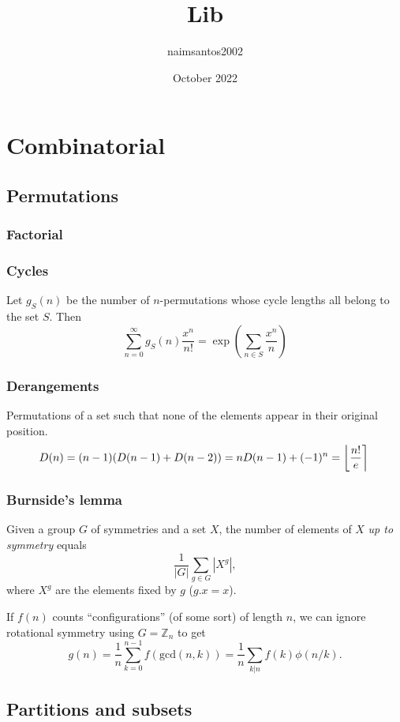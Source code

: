 \documentclass{article}
\title{Lib}
\author{naimsantos2002 }
\date{October 2022}
\begin{document}
\maketitle

\chapter{Combinatorial}
 
\section{Permutations}
	\subsection{Factorial}
		

	\subsection{Cycles}
		Let $g_S(n)$ be the number of $n$-permutations whose cycle lengths all belong to the set $S$. Then
		$$\sum_{n=0} ^\infty g_S(n) \frac{x^n}{n!} = \exp\left(\sum_{n\in S} \frac{x^n} {n} \right)$$

	\subsection{Derangements}
		Permutations of a set such that none of the elements appear in their original position.
		\[ \mkern-2mu D(n) = (n-1)(D(n-1)+D(n-2)) = n D(n-1)+(-1)^n = \left\lfloor\frac{n!}{e}\right\rceil \]

	\subsection{Burnside's lemma}
		Given a group $G$ of symmetries and a set $X$, the number of elements of $X$ \emph{up to symmetry} equals
		 \[ {\frac {1}{|G|}}\sum _{{g\in G}}|X^{g}|, \]
		 where $X^{g}$ are the elements fixed by $g$ ($g.x = x$).

		 If $f(n)$ counts ``configurations'' (of some sort) of length $n$, we can ignore rotational symmetry using $G = \mathbb Z_n$ to get
		 \[ g(n) = \frac 1 n \sum_{k=0}^{n-1}{f(\text{gcd}(n, k))} = \frac 1 n \sum_{k|n}{f(k)\phi(n/k)}. \]

\section{Partitions and subsets}
\end{document}
